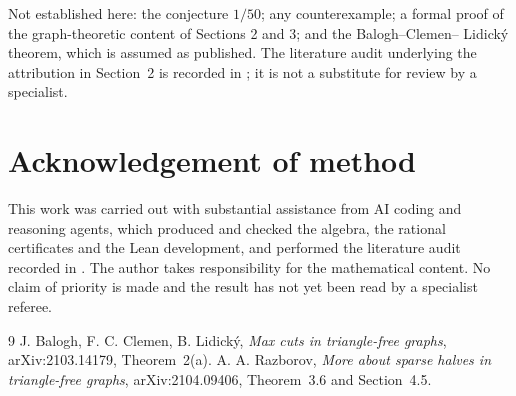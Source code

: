 \documentclass[11pt]{article}
\theoremstyle{remark}
\begin{document}
Not established here: the conjecture $1/50$; any counterexample; a formal proof
of the graph-theoretic content of Sections 2 and 3; and the Balogh--Clemen--%
Lidick\'y theorem, which is assumed as published. The literature audit
underlying the attribution in Section~2 is recorded in ;
it is not a substitute for review by a specialist.

\section*{Acknowledgement of method}
This work was carried out with substantial assistance from AI coding and
reasoning agents, which produced and checked the algebra, the rational
certificates and the Lean development, and performed the literature audit
recorded in . The author takes responsibility for the
mathematical content. No claim of priority is made and the result has not yet
been read by a specialist referee.

\begin{thebibliography}{9}
 J. Balogh, F. C. Clemen, B. Lidick\'y,
\emph{Max cuts in triangle-free graphs}, arXiv:2103.14179, Theorem~2(a).
 A. A. Razborov,
\emph{More about sparse halves in triangle-free graphs},
arXiv:2104.09406, Theorem~3.6 and Section~4.5.
\end{thebibliography}
\end{document}
